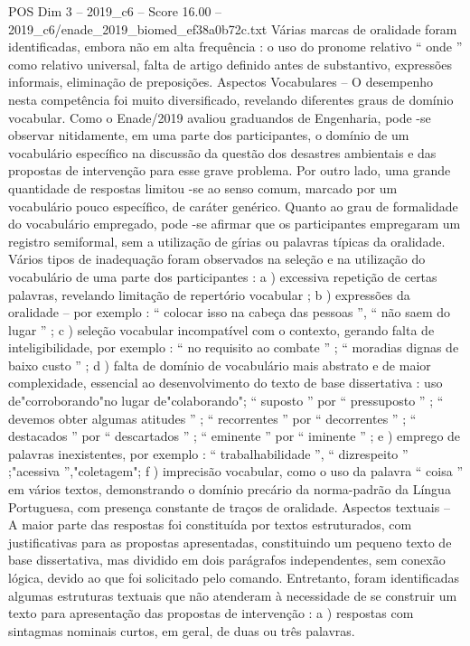 \begin{textsample}{POS Dim 3 – 2019\_c6 – Score 16.00 – 2019\_c6/enade\_2019\_biomed\_ef38a0b72c.txt}
Várias marcas de oralidade foram identificadas, embora não em alta frequência : o uso do pronome relativo “ onde ” como relativo universal, falta de artigo definido antes de substantivo, expressões informais, eliminação de preposições.
Aspectos Vocabulares – O desempenho nesta competência foi muito diversificado, revelando diferentes graus de domínio vocabular.
Como o Enade/2019 avaliou graduandos de Engenharia, pode -se observar nitidamente, em uma parte dos participantes, o domínio de um vocabulário específico na discussão da questão dos desastres ambientais e das propostas de intervenção para esse grave problema.
Por outro lado, uma grande quantidade de respostas limitou -se ao senso comum, marcado por um vocabulário pouco específico, de caráter genérico.
Quanto ao grau de formalidade do vocabulário empregado, pode -se afirmar que os participantes empregaram um registro semiformal, sem a utilização de gírias ou palavras típicas da oralidade.
Vários tipos de inadequação foram observados na seleção e na utilização do vocabulário de uma parte dos participantes : a ) excessiva repetição de certas palavras, revelando limitação de repertório vocabular ; b ) expressões da oralidade – por exemplo : “ colocar isso na cabeça das pessoas ”, “ não saem do lugar ” ; c ) seleção vocabular incompatível com o contexto, gerando falta de inteligibilidade, por exemplo : “ no requisito ao combate ” ; “ moradias dignas de baixo custo ” ; d ) falta de domínio de vocabulário mais abstrato e de maior complexidade, essencial ao desenvolvimento do texto de base dissertativa : uso de"corroborando"no lugar de"colaborando"; “ suposto ” por “ pressuposto ” ; “ devemos obter algumas atitudes ” ; “ recorrentes ” por “ decorrentes ” ; “ destacados ” por “ descartados ” ; “ eminente ” por “ iminente ” ; e ) emprego de palavras inexistentes, por exemplo : “ trabalhabilidade ”, “ dizrespeito ” ;"acessiva ”,"coletagem"; f ) imprecisão vocabular, como o uso da palavra “ coisa ” em vários textos, demonstrando o domínio precário da norma-padrão da Língua Portuguesa, com presença constante de traços de oralidade.
Aspectos textuais – A maior parte das respostas foi constituída por textos estruturados, com justificativas para as propostas apresentadas, constituindo um pequeno texto de base dissertativa, mas dividido em dois parágrafos independentes, sem conexão lógica, devido ao que foi solicitado pelo comando.
Entretanto, foram identificadas algumas estruturas textuais que não atenderam à necessidade de se construir um texto para apresentação das propostas de intervenção : a ) respostas com sintagmas nominais curtos, em geral, de duas ou três palavras.

\end{textsample}
